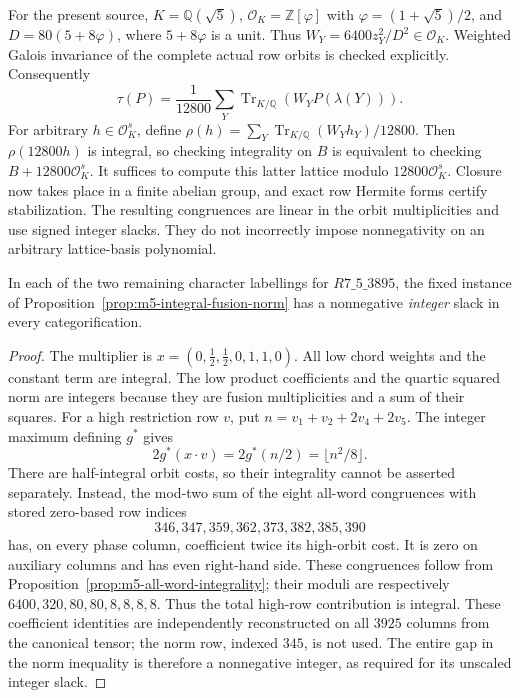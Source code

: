 For the present source, $K=\mathbb Q(\sqrt5)$,
$\mathcal O_K=\mathbb Z[\varphi]$ with
$\varphi=(1+\sqrt5)/2$, and
$D=80(5+8\varphi)$, where $5+8\varphi$ is a unit.  Thus
$W_Y=6400z_Y^2/D^2\in\mathcal O_K$.  Weighted Galois invariance of
the complete actual row orbits is checked explicitly.  Consequently
\[
 \tau(P)=\frac1{12800}\sum_Y
       \operatorname{Tr}_{K/\mathbb Q}(W_YP(\lambda(Y))).
\]
For arbitrary $h\in\mathcal O_K^s$, define
$\rho(h)=\sum_Y\operatorname{Tr}_{K/\mathbb Q}(W_Yh_Y)/12800$.
Then $\rho(12800h)$ is integral, so checking integrality on $B$ is
equivalent to checking $B+12800\mathcal O_K^s$.
It suffices to compute this latter lattice modulo
$12800\mathcal O_K^s$.  Closure now takes place in a finite abelian
group, and exact row Hermite forms certify stabilization.  The resulting
congruences are linear in the orbit multiplicities and use signed
integer slacks.  They do not incorrectly impose nonnegativity on an
arbitrary lattice-basis polynomial.

\begin{lemma}
\label{lem:m5-3895-norm-slack}
In each of the two remaining character labellings for
$R7\_5\_3895$, the fixed instance of
Proposition~\ref{prop:m5-integral-fusion-norm} has a nonnegative
\emph{integer} slack in every categorification.
\end{lemma}
\begin{proof}
The multiplier is $x=(0,\tfrac12,\tfrac12,0,1,1,0)$.
All low chord weights and the constant term are integral.  The low
product coefficients and the quartic squared norm are integers because
they are fusion multiplicities and a sum of their squares.
For a high restriction row $v$, put
$n=v_1+v_2+2v_4+2v_5$.  The integer maximum defining $g^*$ gives
\[
 2g^*(x\cdot v)=2g^*(n/2)=\lfloor n^2/8\rfloor.
\]
There are half-integral orbit costs, so their integrality cannot be
asserted separately.  Instead, the mod-two sum of the eight all-word
congruences with stored zero-based row indices
\[
 346,347,359,362,373,382,385,390
\]
has, on every phase column, coefficient twice its high-orbit cost.
It is zero on auxiliary columns and has even right-hand side.  These
congruences follow from Proposition~\ref{prop:m5-all-word-integrality};
their moduli are respectively
$6400,320,80,80,8,8,8,8$.  Thus the total high-row contribution is
integral.  These coefficient identities are independently reconstructed
on all $3925$ columns from the canonical tensor; the norm row, indexed
$345$, is not used.  The entire gap in the norm inequality is therefore
a nonnegative integer, as required for its unscaled integer slack.
\end{proof}

